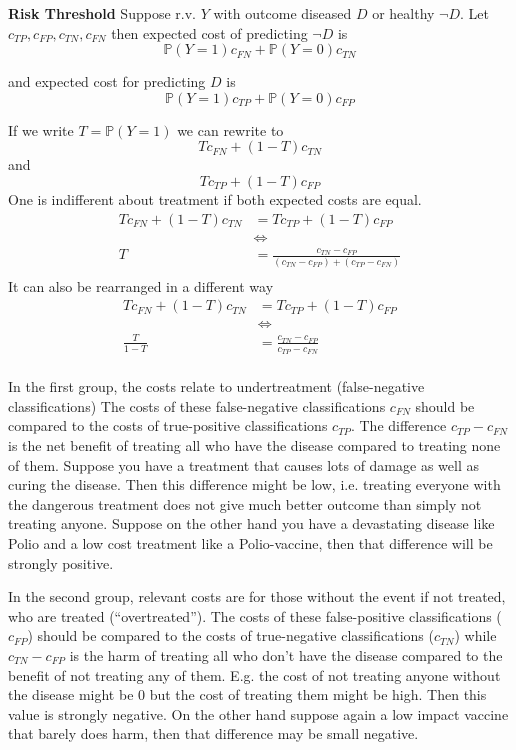 \textbf{Risk Threshold}
Suppose r.v. $Y$ with outcome diseased $D$ or healthy $\neg D$.
Let $c_{TP}, c_{FP}, c_{TN}, c_{FN}$ then expected cost of predicting $\neg D$ is
\[
	\mathbb{P}(Y = 1) c_{FN} + \mathbb{P}(Y = 0) c_{TN}
\]

and expected cost for predicting $D$ is
\[
	\mathbb{P}(Y = 1) c_{TP} + \mathbb{P}(Y = 0) c_{FP}
\]

If we write $T = \mathbb{P}(Y = 1)$ we can rewrite to
\[
	T c_{FN} + (1-T) c_{TN}
\]
and
\[
	T c_{TP} + (1-T) c_{FP}
\]
One is indifferent about treatment if both expected costs are equal.
\[
\begin{aligned}
	T c_{FN} + (1-T) c_{TN} &= T c_{TP} + (1-T) c_{FP} \\
	&\Leftrightarrow \\
	T &= \frac{c_{TN} - c_{FP}}{(c_{TN} - c_{FP}) + (c_{TP} - c_{FN})} \\
\end{aligned}
\]
It can also be rearranged in a different way
\[
\begin{aligned}
	T c_{FN} + (1-T) c_{TN} &= T c_{TP} + (1-T) c_{FP} \\
	&\Leftrightarrow \\
	\frac{T}{1 - T} &= \frac{ c_{TN} - c_{FP} }{ c_{TP} - c_{FN} } \\
\end{aligned}
\]

In the first group, the costs relate to undertreatment (false-negative classifications)
The costs of these false-negative classifications $c_{FN}$ should be compared to the costs of true-positive classifications $c_{TP}$.
The difference $c_{TP} - c_{FN}$ is the net benefit of treating all who have the disease compared to treating none of them.
Suppose you have a treatment that causes lots of damage as well as curing the disease. 
Then this difference might be low, i.e. treating everyone with the dangerous treatment does not give much better outcome than simply not treating anyone.
Suppose on the other hand you have a devastating disease like Polio and a low cost treatment like a Polio-vaccine, then that difference will be strongly positive.

In the second group, relevant costs are for those without the event if not treated, who are treated (“overtreated”).
The costs of these false-positive classifications ($c_{FP}$) should be compared to the costs of true-negative classifications ($c_{TN}$)
while $c_{TN} - c_{FP}$ is the harm of treating all who don't have the disease compared to the benefit of not treating any of them.
E.g. the cost of not treating anyone without the disease might be 0 but the cost of treating them might be high. Then this value is strongly negative.
On the other hand suppose again a low impact vaccine that barely does harm, then that difference may be small negative. 

